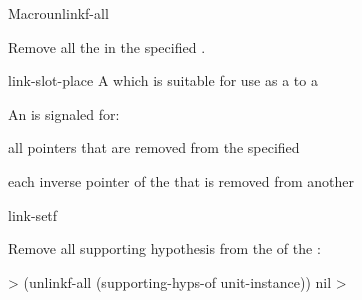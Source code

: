 \documentclass[10pt,twoside,english,pdftex]{article}
\begin{document}

\begin{functiondoc}{Macro}{unlinkf-all}{}
%
%

\fnsyntax

\fnpurpose Remove all the  in the specified
.

\fnpackage {}

\fnmodule {}

\fnargs
\begin{args}{link-slot-place}
 A  which is suitable for use as a
 to a 
\end{args}

\fnevents
{}%
%
%
%
%
%
An  is signaled for:
\begin{tightitemize}
\item all pointers that are removed from the specified
\item each inverse pointer of the  that is removed from
  another 
\end{tightitemize}

\begin{alsos}{link-setf}
\also[linkf]
\also[unlinkf]
\end{alsos}

\fnexample
Remove all supporting hypothesis  from the
  of the 
 :  
%
\W\supp
\begin{example}
  > (unlinkf-all (supporting-hyps-of unit-instance))
  nil
  >
\end{example}

\end{functiondoc}


\W\renewcommand{\subsubentities}{1}

\T\markright{}%
\T\pagestyle{plain}
\T\clearpage
\W{}
\T\pagestyle{fancy}
\T\thispagestyle{fancybottom}
\T\global\def\fnlastname{ }%
\end{document}
